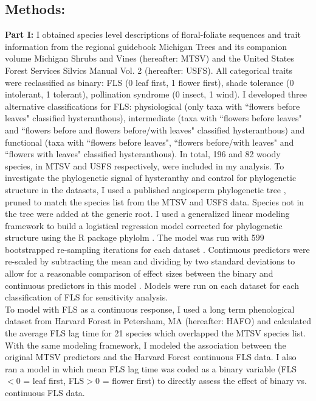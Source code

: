 \documentclass[12pt]{article}\usepackage[]{graphicx}\usepackage[]{color}
\begin{document}
\subsection*{Methods:}
\indent\indent\textbf{Part I:} I obtained species level descriptions of floral-foliate sequences and trait information from the regional guidebook Michigan Trees \citep{Barnes2004} and its companion volume Michigan Shrubs and Vines \citep{Barnes2016} (hereafter: MTSV) and the United States Forest Services Silvics Manual Vol. 2 \citep{Burns1990} (hereafter: USFS). All categorical traits were reclassified as binary: FLS (0 leaf first, 1 flower first), shade tolerance (0 intolerant, 1 tolerant), pollination syndrome (0 insect, 1 wind). I developed three alternative classifications for FLS: physiological (only taxa with ``flowers before leaves" classified hysteranthous), intermediate (taxa with ``flowers before leaves" and ``flowers before and flowers before/with leaves" classified hysteranthous) and functional (taxa with ``flowers before leaves", ``flowers before/with leaves" and ``flowers with leaves" classified hysteranthous). In total, 196 and 82 woody species, in MTSV and USFS respectively, were included in my analysis. To investigate the phylogenetic signal of hysteranthy and control for phylogenetic structure in the datasets, I used a published angiosperm phylogenetic tree \citep{Zanne2013}, pruned to match the species list from the MTSV and USFS data. Species not in the tree were added at the generic root. I used  a generalized linear modeling framework \citep{Ives2010} to build a logistical regression model corrected for phylogenetic structure using the R package phylolm \citep{Ho2014}. The model was run with 599 bootstrapped re-sampling iterations for each dataset \citep{Wilcox2010}. Continuous predictors were re-scaled by subtracting the mean and dividing by two standard deviations to allow for a reasonable comparison of effect sizes between the binary and continuous predictors in this model \citep{Gelman2007}. Models were run on each dataset for each classification of FLS for sensitivity analysis.\\ 
\indent To model with FLS as a continuous response, I used a long term phenological dataset from Harvard Forest in Petersham, MA \citep{Okeefe2015} (hereafter: HAFO)  and calculated the average FLS lag time for 21 species which overlapped the MTSV species list. With the same modeling framework, I modeled the association between the original MTSV predictors and the Harvard Forest continuous FLS data. I also ran a model in which mean FLS lag time was coded as a binary variable (FLS$<0$ = leaf first, FLS$>0$ = flower first) to directly assess the effect of binary vs. continuous FLS data.\\
\end{document}
